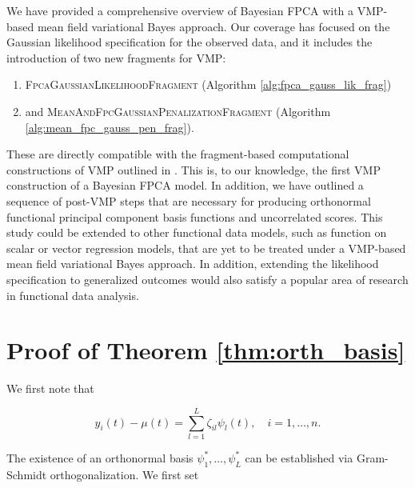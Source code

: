 \documentclass[12pt]{article}
\theoremstyle{plain}
\theoremstyle{definition}
\theoremstyle{remark}
\begin{document}
We have provided a comprehensive overview of Bayesian FPCA with a VMP-based mean field variational Bayes
approach. Our coverage has focused on the Gaussian likelihood specification for the observed data, and it
includes the introduction of two new fragments for VMP:

\begin{enumerate}
	\item \textsc{FpcaGaussianLikelihoodFragment} (Algorithm \ref{alg:fpca_gauss_lik_frag})
	\item and \textsc{MeanAndFpcGaussianPenalizationFragment} (Algorithm \ref{alg:mean_fpc_gauss_pen_frag}).
\end{enumerate}

\noindent These are directly compatible with the fragment-based computational constructions of VMP outlined in
. This is, to our knowledge, the first VMP construction of a Bayesian FPCA model. In addition,
we have outlined a sequence of post-VMP steps that are necessary for producing orthonormal functional
principal component basis functions and uncorrelated scores. This study could be extended to other
functional data models, such as function on scalar or vector regression models, that are yet to be treated
under a VMP-based mean field variational Bayes approach. In addition, extending the likelihood specification to
generalized outcomes would also satisfy a popular area of research in functional data analysis.





\appendix


\section{Proof of Theorem \ref{thm:orth_basis}}
\label{app:proof_thm_orth_basis}

We first note that

\begin{equation}
	y_i (t) - \mu (t) = \sum_{l=1}^L \zeta_{il} \psi_l (t), \quad i = 1, \dots, n.
\label{centered_kl_expansion}
\end{equation}

\noindent The existence of an orthonormal basis $\psi^*_1, \dots, \psi^*_L$ can be established via Gram-Schmidt
orthogonalization. We first set
\end{document}
